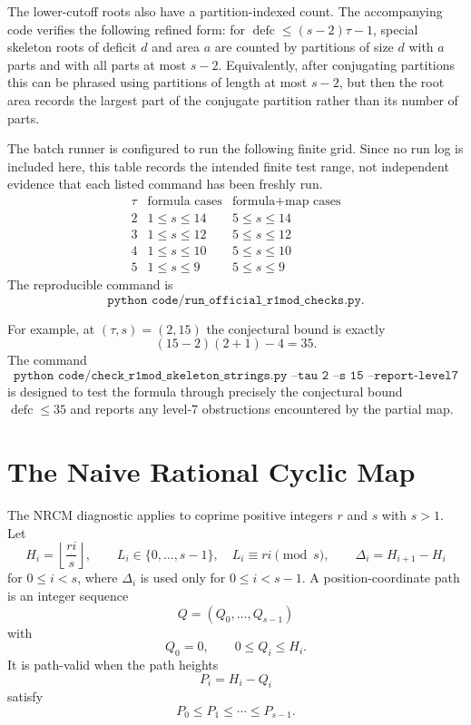 \documentclass{article}
\newcommand{\defc}{\operatorname{defc}}
\begin{document}
The lower-cutoff roots also have a partition-indexed count.  The accompanying
code verifies the following refined form: for \(\defc\le (s-2)\tau-1\),
special skeleton roots of deficit
\(d\) and area \(a\) are counted by partitions of size \(d\) with \(a\) parts
and with all parts at most \(s-2\).  Equivalently, after conjugating
partitions this can be phrased using partitions of length at most \(s-2\), but
then the root area records the largest part of the conjugate partition rather
than its number of parts.

The batch runner is configured to run the following finite grid.  Since no run
log is included here, this table records the intended finite test range, not
independent evidence that each listed command has been freshly run.
\[
\begin{array}{c|c|c}
\tau & \text{formula cases} & \text{formula+map cases}\\
\hline
2 & 1\le s\le14 & 5\le s\le14\\
3 & 1\le s\le12 & 5\le s\le12\\
4 & 1\le s\le10 & 5\le s\le10\\
5 & 1\le s\le9  & 5\le s\le9
\end{array}
\]
The reproducible command is
\[
  \texttt{python code/run\_official\_r1mod\_checks.py}.
\]

For example, at \((\tau,s)=(2,15)\) the conjectural bound is exactly
\[
  (15-2)(2+1)-4=35.
\]
The command
\[
  \texttt{python code/check\_r1mod\_skeleton\_strings.py --tau 2 --s 15 --report-level7}
\]
is designed to test the formula through precisely the conjectural bound
\(\defc\le35\) and reports any level-7 obstructions encountered by the partial
map.

\section{The Naive Rational Cyclic Map}

The NRCM diagnostic applies to coprime positive integers \(r\) and \(s\) with
\(s>1\).  Let
\[
  H_i=\left\lfloor\frac{ri}{s}\right\rfloor,\qquad
  L_i\in\{0,\ldots,s-1\},\quad L_i\equiv ri\pmod s,\qquad
  \Delta_i=H_{i+1}-H_i
\]
for \(0\le i<s\), where \(\Delta_i\) is used only for \(0\le i<s-1\).
A position-coordinate path is an integer sequence
\[
  Q=(Q_0,\ldots,Q_{s-1})
\]
with
\[
  Q_0=0,\qquad 0\le Q_i\le H_i.
\]
It is path-valid when the path heights
\[
  P_i=H_i-Q_i
\]
satisfy
\[
  P_0\le P_1\le\cdots\le P_{s-1}.
\]
\end{document}
